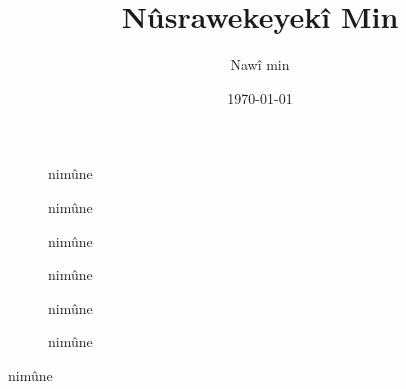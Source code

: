 \documentclass{article}
\title{Nûsrawekeyekî Min}
\author{Nawî min}
\date{\today}
\begin{document}
\maketitle

\begin{figure}
\caption{nimûne}
\end{figure}

\begin{figure}
\caption{nimûne}
\end{figure}
\begin{figure}
\caption{nimûne}
\end{figure}
\begin{figure}
\caption{nimûne}
\end{figure}
\begin{figure}
\caption{nimûne}
\end{figure}
\begin{figure}
\caption{nimûne}
\end{figure}
\begin{table}
\caption{nimûne}
\end{table}
\end{document}
